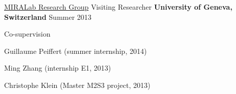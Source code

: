 \begin{cventries}
   \cventry
   {\href{http://www.miralab.ch/}{MIRALab Research Group}}
   {Visiting Researcher}
   {\textbf{University of Geneva, Switzerland}}
   {Summer 2013}
   {} %
   
   \cventry
   {}
   {\vspace{-7.0mm}Co-supervision}
   {}
   {}
   {
     \begin{cvitems}
     \item{Guillaume Peiffert (summer internship, 2014)}
     \item{Ming Zhang (internship E1, 2013)}
	 \item{Christophe Klein  (Master M2S3 project, 2013)}
     \end{cvitems}
   } %

\end{cventries}
